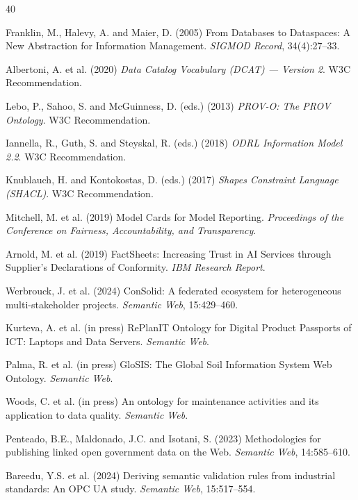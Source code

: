 \documentclass[11pt,a4paper]{article}
\begin{document}
\begin{thebibliography}{40}

 Franklin, M., Halevy, A. and Maier, D. (2005) From Databases to Dataspaces: A New Abstraction for Information Management. \emph{SIGMOD Record}, 34(4):27--33.

 Albertoni, A. et al. (2020) \emph{Data Catalog Vocabulary (DCAT) --- Version 2}. W3C Recommendation.

 Lebo, P., Sahoo, S. and McGuinness, D. (eds.) (2013) \emph{PROV-O: The PROV Ontology}. W3C Recommendation.

 Iannella, R., Guth, S. and Steyskal, R. (eds.) (2018) \emph{ODRL Information Model 2.2}. W3C Recommendation.

 Knublauch, H. and Kontokostas, D. (eds.) (2017) \emph{Shapes Constraint Language (SHACL)}. W3C Recommendation.

 Mitchell, M. et al. (2019) Model Cards for Model Reporting. \emph{Proceedings of the Conference on Fairness, Accountability, and Transparency}.

 Arnold, M. et al. (2019) FactSheets: Increasing Trust in AI Services through Supplier's Declarations of Conformity. \emph{IBM Research Report}.

 Werbrouck, J. et al. (2024) ConSolid: A federated ecosystem for heterogeneous multi-stakeholder projects. \emph{Semantic Web}, 15:429--460.

 Kurteva, A. et al. (in press) RePlanIT Ontology for Digital Product Passports of ICT: Laptops and Data Servers. \emph{Semantic Web}.

 Palma, R. et al. (in press) GloSIS: The Global Soil Information System Web Ontology. \emph{Semantic Web}.

 Woods, C. et al. (in press) An ontology for maintenance activities and its application to data quality. \emph{Semantic Web}.

 Penteado, B.E., Maldonado, J.C. and Isotani, S. (2023) Methodologies for publishing linked open government data on the Web. \emph{Semantic Web}, 14:585--610.

 Bareedu, Y.S. et al. (2024) Deriving semantic validation rules from industrial standards: An OPC UA study. \emph{Semantic Web}, 15:517--554.


\end{thebibliography}
\end{document}
